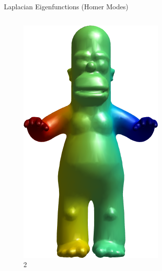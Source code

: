 \documentclass{beamer}
\begin{document}
\begin{frame}{Laplacian Eigenfunctions (Homer Modes)}
\begin{columns}
\begin{column}[T]{3cm}
\begin{figure}[t]
    \includegraphics[width=\textwidth]{../23_Spectral/Harmonics/HomerModes/2.png}
    \caption*{\huge 2}
\end{figure}
\end{column}
\end{columns}

\end{frame}
\end{document}
